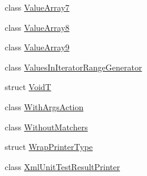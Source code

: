 \begin{DoxyCompactItemize}
\item 
class \mbox{\hyperlink{classtesting_1_1internal_1_1_value_array7}{Value\+Array7}}
\item 
class \mbox{\hyperlink{classtesting_1_1internal_1_1_value_array8}{Value\+Array8}}
\item 
class \mbox{\hyperlink{classtesting_1_1internal_1_1_value_array9}{Value\+Array9}}
\item 
class \mbox{\hyperlink{classtesting_1_1internal_1_1_values_in_iterator_range_generator}{Values\+In\+Iterator\+Range\+Generator}}
\item 
struct \mbox{\hyperlink{structtesting_1_1internal_1_1_void_t}{VoidT}}
\item 
class \mbox{\hyperlink{structtesting_1_1internal_1_1_with_args_action}{With\+Args\+Action}}
\item 
class \mbox{\hyperlink{classtesting_1_1internal_1_1_without_matchers}{Without\+Matchers}}
\item 
struct \mbox{\hyperlink{structtesting_1_1internal_1_1_wrap_printer_type}{Wrap\+Printer\+Type}}
\item 
class \mbox{\hyperlink{classtesting_1_1internal_1_1_xml_unit_test_result_printer}{Xml\+Unit\+Test\+Result\+Printer}}
\end{DoxyCompactItemize}
